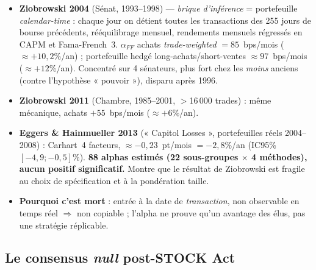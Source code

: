 \documentclass[11pt,a4paper]{article}
\begin{document}
\begin{itemize}
  \item \textbf{Ziobrowski 2004} (Sénat, 1993--1998) --- \emph{brique d'inférence} = portefeuille
  \emph{calendar-time} : chaque jour on détient toutes les transactions des 255 jours de bourse précédents,
  rééquilibrage mensuel, rendements mensuels régressés en CAPM et Fama-French~3. $\alpha_{FF}$ achats
  \emph{trade-weighted} $= 85$~bps/mois ($\approx +10{,}2\%$/an) ; portefeuille hedgé long-achats/short-ventes
  $\approx 97$~bps/mois ($\approx +12\%$/an). Concentré sur 4 sénateurs, plus fort chez les \emph{moins}
  anciens (contre l'hypothèse « pouvoir »), disparu après 1996.
  \item \textbf{Ziobrowski 2011} (Chambre, 1985--2001, $>$16\,000 trades) : même mécanique, achats
  $+55$~bps/mois ($\approx +6\%$/an).
  \item \textbf{Eggers \& Hainmueller 2013} (« Capitol Losses », portefeuilles réels 2004--2008) : Carhart~4
  facteurs, $\approx -0{,}23$~pt/mois $= -2{,}8\%$/an (IC95\% $[-4{,}9 ; -0{,}5]\%$). \textbf{88 alphas estimés
  (22 sous-groupes $\times$ 4 méthodes), aucun positif significatif.} Montre que le résultat de Ziobrowski est
  fragile au choix de spécification et à la pondération taille.
  \item \textbf{Pourquoi c'est mort} : entrée à la date de \emph{transaction}, non observable en temps réel
  $\Rightarrow$ non copiable ; l'alpha ne prouve qu'un avantage des élus, pas une stratégie réplicable.
\end{itemize}

\subsection{Le consensus \textit{null} post-STOCK Act}
\end{document}
